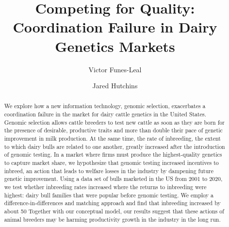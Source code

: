 \documentclass[12pt,letterpaper]{article}
\title{Competing for Quality: Coordination Failure in Dairy Genetics Markets}
\author[1]{Victor Funes-Leal}
\author[2]{Jared Hutchins}
\affil[1]{Department of Agricultural Economics and Agribusiness\\ University of Arkansas}
\affil[2]{Department of Agricultural and Consumer Economics\\ University of Illinois Urbana Champaign}
\date{} %
\begin{document}
\maketitle



\begin{abstract}
    \noindent
    \singlespacing
    
    We explore how a new information technology, genomic selection, exacerbates a coordination failure in the market for dairy cattle genetics in the United States. 
    Genomic selection allows cattle breeders to test new cattle as soon as they are born for the presence of desirable, productive traits and more than double their pace of genetic improvement in milk production. At the same time, the rate of inbreeding, the extent to which dairy bulls are related to one another, greatly increased after the introduction of genomic testing.
    In a market where firms must produce the highest-quality genetics to capture market share, we hypothesize that genomic testing increased incentives to inbreed, an action that leads to welfare losses in the industry by dampening future genetic improvement.
    Using a data set of bulls marketed in the US from 2001 to 2020, we test whether inbreeding rates increased where the returns to inbreeding were highest: dairy bull families that were popular before genomic testing.
    We employ a difference-in-differences and matching approach and find that inbreeding increased by about 50%
    Together with our conceptual model, our results suggest that these actions of animal breeders may be harming productivity growth in the industry in the long run.
\end{abstract}
\end{document}
